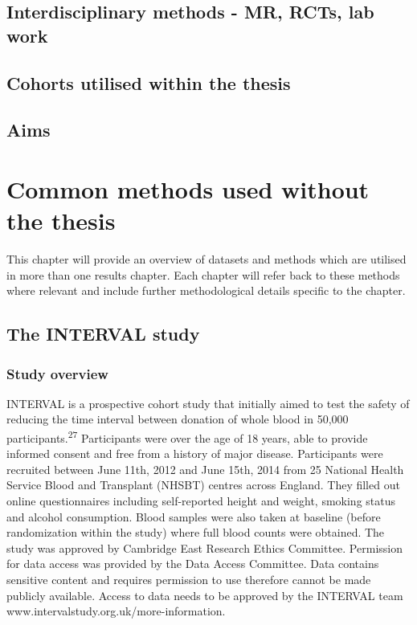 \documentclass[11pt,twoside]{bristolthesis}
\begin{document}
\hypertarget{interdisciplinary-methods---mr-rcts-lab-work}{%
\section{Interdisciplinary methods - MR, RCTs, lab work}\label{interdisciplinary-methods---mr-rcts-lab-work}}

\hypertarget{cohorts-utilised-within-the-thesis}{%
\section{Cohorts utilised within the thesis}\label{cohorts-utilised-within-the-thesis}}

\hypertarget{aims}{%
\section{Aims}\label{aims}}

\hypertarget{common-methods}{%
\chapter{Common methods used without the thesis}\label{common-methods}}

This chapter will provide an overview of datasets and methods which are utilised in more than one results chapter. Each chapter will refer back to these methods where relevant and include further methodological details specific to the chapter.

\hypertarget{the-interval-study}{%
\section{The INTERVAL study}\label{the-interval-study}}

\hypertarget{study-overview}{%
\subsection{Study overview}\label{study-overview}}

INTERVAL is a prospective cohort study that initially aimed to test the safety of reducing the time interval between donation of whole blood in 50,000 participants.\textsuperscript{27} Participants were over the age of 18 years, able to provide informed consent and free from a history of major disease. Participants were recruited between June 11th, 2012 and June 15th, 2014 from 25 National Health Service Blood and Transplant (NHSBT) centres across England. They filled out online questionnaires including self-reported height and weight, smoking status and alcohol consumption. Blood samples were also taken at baseline (before randomization within the study) where full blood counts were obtained. The study was approved by Cambridge East Research Ethics Committee. Permission for data access was provided by the Data Access Committee. Data contains sensitive content and requires permission to use therefore cannot be made publicly available. Access to data needs to be approved by the INTERVAL team www.intervalstudy.org.uk/more-information.
\end{document}
